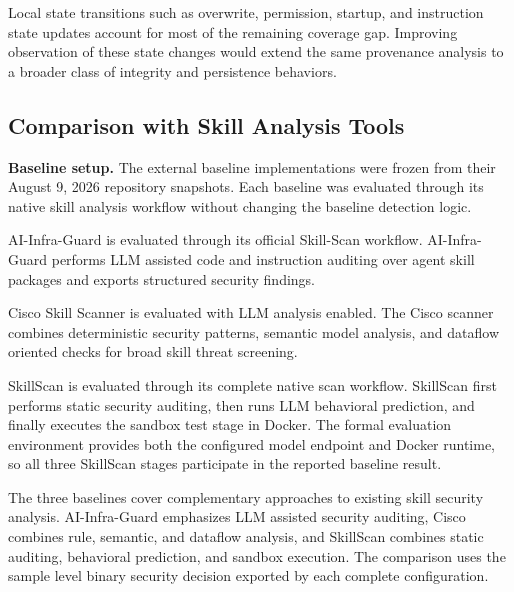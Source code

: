 Local state transitions such as overwrite, permission, startup, and
instruction state updates account for most of the remaining coverage gap.
Improving observation of these state changes would extend the same provenance
analysis to a broader class of integrity and persistence behaviors.



\subsection{Comparison with Skill Analysis Tools}
\label{sec:eval-baselines}

\textbf{Baseline setup.}
The external baseline implementations were frozen from their August 9, 2026
repository snapshots. Each baseline was evaluated through its native skill
analysis workflow without changing the baseline detection logic.

AI-Infra-Guard is evaluated through its official Skill-Scan workflow.
AI-Infra-Guard performs LLM assisted code and instruction auditing over agent
skill packages and exports structured security findings.

Cisco Skill Scanner is evaluated with LLM analysis enabled. The Cisco scanner
combines deterministic security patterns, semantic model analysis, and
dataflow oriented checks for broad skill threat screening.

SkillScan is evaluated through its complete native scan workflow. SkillScan
first performs static security auditing, then runs LLM behavioral prediction,
and finally executes the sandbox test stage in Docker. The formal evaluation
environment provides both the configured model endpoint and Docker runtime, so
all three SkillScan stages participate in the reported baseline result.

The three baselines cover complementary approaches to existing skill
security analysis. AI-Infra-Guard emphasizes LLM assisted security auditing,
Cisco combines rule, semantic, and dataflow analysis, and SkillScan combines
static auditing, behavioral prediction, and sandbox execution. The comparison
uses the sample level binary security decision exported by each complete
configuration.

